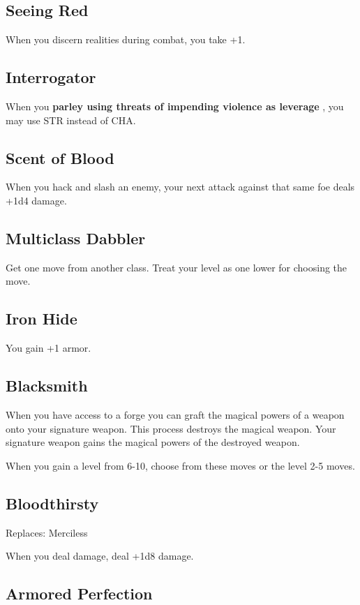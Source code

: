 \subsection{Seeing Red}


 When you discern realities during combat, you take +1.
\subsection{Interrogator}


 When you \textbf{parley using threats of impending violence as leverage}
, you may use STR instead of CHA.
\subsection{Scent of Blood}


 When you hack and slash an enemy, your next attack against that same foe deals +1d4 damage.
\subsection{Multiclass Dabbler}


 Get one move from another class. Treat your level as one lower for choosing the move.
\subsection{Iron Hide}


 You gain +1 armor.
\subsection{Blacksmith}


 When you have access to a forge you can graft the magical powers of a weapon onto your signature weapon. This process destroys the magical weapon. Your signature weapon gains the magical powers of the destroyed weapon.


\vspace{\baselineskip}
{\Large When you gain a level from 6-10, choose from these moves or the level 2-5 moves.}
\subsection{Bloodthirsty}


 Replaces: Merciless


 When you deal damage, deal +1d8 damage.
\subsection{Armored Perfection}


